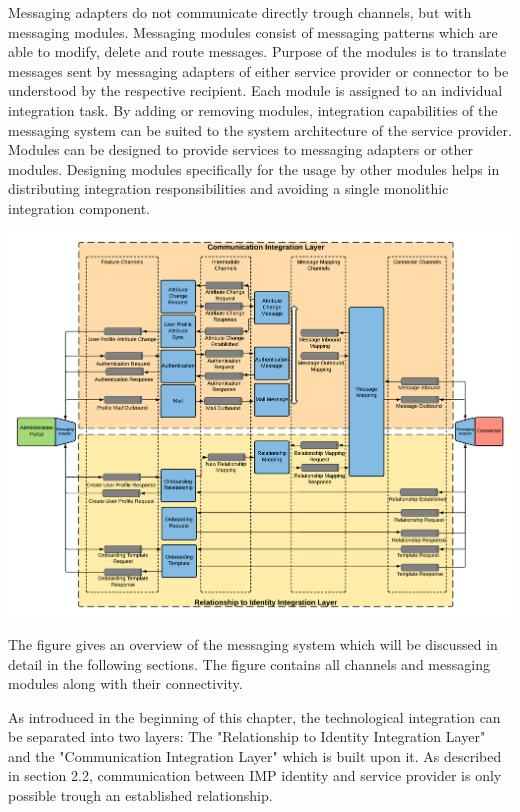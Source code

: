Messaging adapters do not communicate directly trough channels, but with messaging modules. Messaging modules consist of messaging patterns which are able to modify, delete and route messages. Purpose of the modules is to translate messages sent by messaging adapters of either service provider or connector to be understood by the respective recipient. Each module is assigned to an individual integration task. By adding or removing modules, integration capabilities of the messaging system can be suited to the system architecture of the service provider. Modules can be designed to provide services to messaging adapters or other modules. Designing modules specifically for the usage by other modules helps in distributing integration responsibilities and avoiding a single monolithic integration component.

\begin{center}
    \includegraphics[scale=0.5]{Diagrams/Integration Architecture 1/Technological Integration/4. Messaging Overview.pdf}
\end{center}

The figure gives an overview of the messaging system which will be discussed in detail in the following sections. The figure contains all channels and messaging modules along with their connectivity.

As introduced in the beginning of this chapter, the technological integration can be separated into two layers: The "Relationship to Identity Integration Layer" and the "Communication Integration Layer" which is built upon it. As described in section 2.2, communication between IMP identity and service provider is only possible trough an established relationship.

